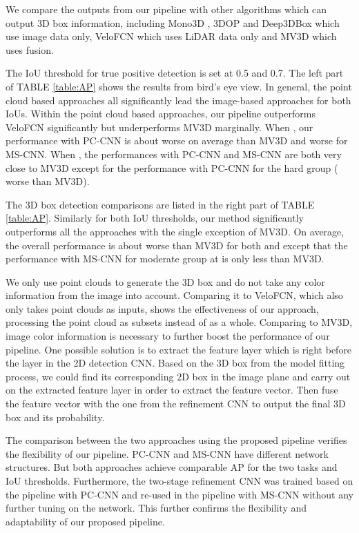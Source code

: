 \documentclass[letterpaper, 10 pt, conference]{ieeeconf}  \usepackage[
\begin{document}
 We compare the outputs from our pipeline with other algorithms which can output 3D box information, including Mono3D \cite{chen2016monocular}, 3DOP \cite{xiang2015data} and Deep3DBox \cite{mousavian20163d} which use image data only, VeloFCN \cite{li2016vehicle} which uses LiDAR data only and MV3D \cite{Chen2017CVPR} which uses fusion.

The IoU threshold for true positive detection is set at 0.5 and 0.7. The left part of TABLE \ref{table:AP} shows the results from bird's eye view. In general, the point cloud based approaches all significantly lead the image-based approaches for both IoUs. Within the point cloud based approaches, our pipeline outperforms VeloFCN significantly but underperforms MV3D marginally. When , our performance with PC-CNN is about  worse on average than MV3D and  worse for MS-CNN. When , the performances with PC-CNN and MS-CNN are both very close to MV3D except for the performance with PC-CNN for the hard group ( worse than MV3D).

The 3D box detection comparisons are listed in the right part of TABLE \ref{table:AP}. Similarly for both IoU thresholds, our method significantly outperforms all the approaches with the single exception of MV3D. On average, the overall performance is about  worse than MV3D for both  and  except that the performance with MS-CNN for moderate group at  is only  less than MV3D.

We only use point clouds to generate the 3D box and do not take any color information from the image into account. Comparing it to VeloFCN, which also only takes point clouds as inputs, shows the effectiveness of our approach, processing the point cloud as subsets instead of as a whole. Comparing to MV3D, image color information is necessary to further boost the performance of our pipeline. One possible solution is to extract the feature layer which is right before the  layer in the 2D detection CNN. Based on the 3D box from the model fitting process, we could find its corresponding 2D box in the image plane and carry out  on the extracted feature layer in order to extract the feature vector. Then fuse the feature vector with the one from the refinement CNN to output the final 3D box and its probability.

 The comparison between the two approaches using the proposed pipeline verifies the flexibility of our pipeline. PC-CNN and MS-CNN have different network structures. But both approaches achieve comparable AP for the two tasks and IoU thresholds. Furthermore, the two-stage refinement CNN was trained based on the pipeline with PC-CNN and re-used in the pipeline with MS-CNN without any further tuning on the network. This further confirms the flexibility and adaptability of our proposed pipeline.
\end{document}
